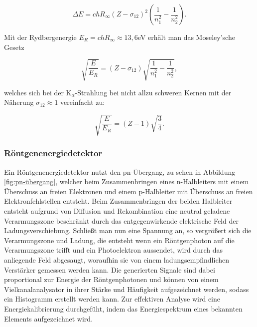 \documentclass{article}
\begin{document}
\begin{equation}
    \Delta E = ch R_\infty (Z - \sigma_{12})^2 \left( \frac{1}{n_1^2} - \frac{1}{n_2^2} \right).
\end{equation}

Mit der Rydbergenergie $E_R = ch R_\infty \approx 13,6$eV erhält man das Moseley'sche Gesetz

\begin{equation}
    \sqrt{\frac{E}{E_R}} =(Z - \sigma_{12}) \sqrt{ \frac{1}{n_1^2} - \frac{1}{n_2^2}},
\end{equation}

welches sich bei der K$_\alpha$-Strahlung bei nicht allzu schweren Kernen mit der Näherung $\sigma_{12} \approx 1$ vereinfacht zu:

\begin{equation}
    \sqrt{\frac{E}{E_R}} =(Z - 1) \sqrt{ \frac{3}{4}}.
\end{equation}


\subsubsection{Röntgenenergiedetektor}

Ein Röntgenenergiedetektor nutzt den pn-Übergang, zu sehen in Abbildung \ref{fig:pn-übergang}, welcher beim Zusammenbringen eines n-Halbleiters mit einem Überschuss an freien Elektronen und einem p-Halbleiter mit Überschuss an freien Elektronfehlstellen entsteht. Beim Zusammenbringen der beiden Halbleiter entsteht aufgrund von Diffusion und Rekombination eine neutral geladene Verarmungszone beschränkt durch das entgegenwirkende elektrische Feld der Ladungsverschiebung. Schließt man nun eine Spannung an, so vergrößert sich die Verarmungszone und Ladung, die entsteht wenn ein Röntgenphoton auf die Verarmungszone trifft und ein Photoelektron aussendet, wird durch das anliegende Feld abgesaugt, woraufhin sie von einem ladungsempfindlichen Verstärker gemessen werden kann. Die generierten Signale sind dabei proportional zur Energie der Röntgenphotonen und können von einem Vielkanalanalysator in ihrer Stärke und Häufigkeit aufgezeichnet werden, sodass ein Histogramm erstellt werden kann. Zur effektiven Analyse wird eine Energiekalibrierung durchgefüht, indem das Energiespektrum eines bekannten Elements aufgezeichnet wird. 

\phantom{.}
\end{document}
